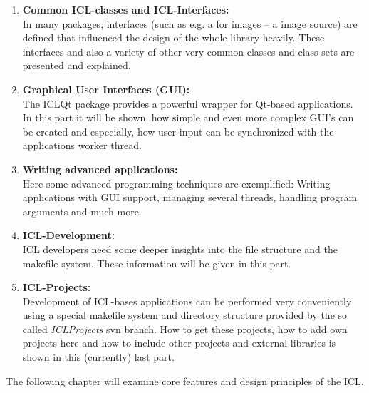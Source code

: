 \begin{enumerate}
\item \textbf{Common ICL-classes and ICL-Interfaces:}\\ In many packages, interfaces (such as e.g. a  for images -- a image source) are defined that influenced the design of the whole library heavily. These interfaces and also a variety of other very common classes and class sets are presented and explained.
\item \textbf{Graphical User Interfaces (GUI):}\\ The ICLQt package provides a powerful wrapper for Qt-based applications. In this part it will be shown, how simple and even more complex GUI's can be created and especially, how user input can be synchronized with the applications worker thread.
\item \textbf{Writing advanced applications:}\\ Here some advanced programming techniques are exemplified: Writing applications with GUI support, managing several threads, handling program arguments and much more.
\item \textbf{ICL-Development:}\\ICL developers need some deeper insights into the file structure and the makefile system. These information will be given in this part.
\item \textbf{ICL-Projects:}\\Development of ICL-bases applications can be performed very conveniently using a special makefile system and directory structure provided by the so called \emph{ICLProjects} svn branch. How to get these projects, how to add own projects here and how to include other projects and external libraries is shown in this (currently) last part. 
\end{enumerate} 


The following chapter will examine core features and design principles of the ICL.



